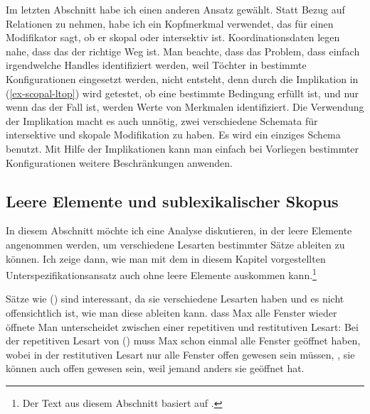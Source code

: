 Im letzten Abschnitt habe ich einen anderen Ansatz gewählt. Statt Bezug auf Relationen zu nehmen,
habe ich ein Kopfmerkmal verwendet, das für einen Modifikator sagt, ob er skopal oder intersektiv
ist. Koordinationsdaten legen nahe, dass das der richtige Weg ist. Man beachte, dass das Problem,
dass einfach irgendwelche Handles identifiziert werden, weil Töchter in bestimmte Konfigurationen
eingesetzt werden, nicht entsteht, denn durch die Implikation in (\ref{ex-scopal-ltop}) wird getestet, ob eine
bestimmte Bedingung erfüllt ist, und nur wenn das der Fall ist, werden Werte von Merkmalen
identifiziert. Die Verwendung der Implikation macht es auch unnötig, zwei verschiedene Schemata für
intersektive und skopale Modifikation zu haben. Es wird ein einziges Schema benutzt. Mit Hilfe
der Implikationen kann man einfach bei Vorliegen bestimmter Konfigurationen weitere Beschränkungen anwenden.

\subsection{Leere Elemente und sublexikalischer Skopus}
\label{Abschnitt-Leere Elemente und sublexikalischer Skopus}

In diesem Abschnitt möchte ich eine Analyse diskutieren, in der leere Elemente angenommen werden, um
verschiedene Lesarten bestimmter Sätze ableiten zu können. Ich zeige dann, wie man mit dem in diesem
Kapitel vorgestellten Unterspezifikationsansatz auch ohne leere Elemente auskommen
kann.\footnote{Der Text aus diesem Abschnitt basiert auf \citet[Abschnitt~11.9.2]{MuellerGTBuch1}.}

Sätze wie () sind interessant, da sie verschiedene Lesarten haben \citep[siehe][Abschnitt~5.6]{Dowty79a} und es nicht offensichtlich ist, wie man diese ableiten kann.
\ea
\label{ex-alle-wieder}
dass Max alle Fenster wieder öffnete
\z
Man unterscheidet zwischen einer repetitiven und restitutiven Lesart: Bei der repetitiven Lesart von
() muss Max schon einmal alle Fenster geöffnet haben, wobei in der restitutiven Lesart nur
alle Fenster offen gewesen sein müssen, \dash, sie können auch offen gewesen sein, weil jemand anders
sie geöffnet hat. 

